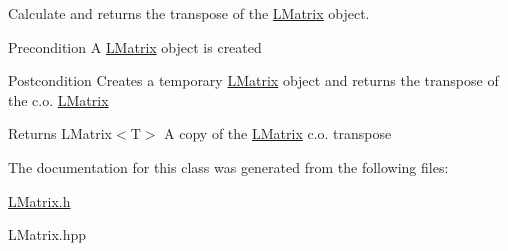 Calculate and returns the transpose of the \mbox{\hyperlink{class_l_matrix}{L\+Matrix}} object. 

\begin{DoxyPrecond}{Precondition}
A \mbox{\hyperlink{class_l_matrix}{L\+Matrix}} object is created 
\end{DoxyPrecond}
\begin{DoxyPostcond}{Postcondition}
Creates a temporary \mbox{\hyperlink{class_l_matrix}{L\+Matrix}} object and returns the transpose of the c.\+o. \mbox{\hyperlink{class_l_matrix}{L\+Matrix}} 
\end{DoxyPostcond}
\begin{DoxyReturn}{Returns}
L\+Matrix$<$\+T$>$ A copy of the \mbox{\hyperlink{class_l_matrix}{L\+Matrix}} c.\+o. transpose 
\end{DoxyReturn}


The documentation for this class was generated from the following files\+:\begin{DoxyCompactItemize}
\item 
\mbox{\hyperlink{_l_matrix_8h}{L\+Matrix.\+h}}\item 
L\+Matrix.\+hpp\end{DoxyCompactItemize}
